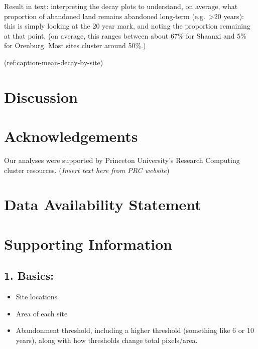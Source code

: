 \documentclass[
]{article}
\providecommand{\tightlist}{%
  \setlength{\itemsep}{0pt}\setlength{\parskip}{0pt}}
\begin{document}
Result in text: interpreting the decay plots to understand, on average, what proportion of abandoned land remains abandoned long-term (e.g.~\textgreater20 years): this is simply looking at the 20 year mark, and noting the proportion remaining at that point. (on average, this ranges between about 67\% for Shaanxi and 5\% for Orenburg. Most sites cluster around 50\%.)

(ref:caption-mean-decay-by-site)

\hypertarget{discussion}{%
\section{Discussion}\label{discussion}}

\hypertarget{acknowledgements}{%
\section{Acknowledgements}\label{acknowledgements}}

Our analyses were supported by Princeton University's Research Computing cluster resources. (\emph{Insert text here from PRC website})

\hypertarget{data-availability-statement}{%
\section{Data Availability Statement}\label{data-availability-statement}}

\hypertarget{supporting-information}{%
\section{Supporting Information}\label{supporting-information}}

\hypertarget{basics}{%
\subsection{1. Basics:}\label{basics}}

\begin{itemize}
\tightlist
\item
  Site locations
\item
  Area of each site
\item
  Abandonment threshold, including a higher threshold (something like 6 or 10 years), along with how thresholds change total pixels/area.
\end{itemize}
\end{document}
